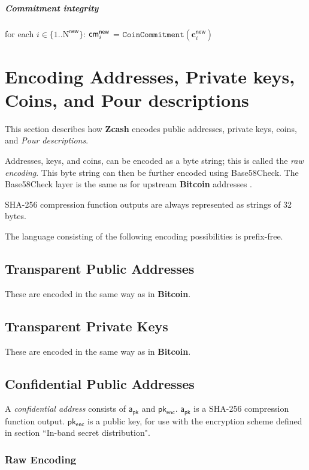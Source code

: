 \documentclass{article}
\newcommand{\changedcolor}{magenta}
\newcommand{\setchanged}{\color{\changedcolor}}
\newcommand{\changed}[1]{{\setchanged{#1}}}
\newcommand{\term}[1]{\textsl{#1}\xspace}
\newcommand{\termbf}[1]{\textbf{#1}\xspace}
\newcommand{\Zcash}{\termbf{Zcash}}
\newcommand{\Bitcoin}{\termbf{Bitcoin}}
\newcommand{\PourDescriptions}{\term{Pour descriptions}}
\newcommand{\publicAddress}{\term{confidential address}}
\newcommand{\SpendAuthorityPublic}{\mathsf{a_{pk}}}
\newcommand{\TransmitPublic}{\mathsf{pk_{enc}}}
\newcommand{\cmNew}[1]{\mathsf{{cm}^{new}_\mathnormal{#1}}}
\newcommand{\NNew}{\mathrm{N}^\mathsf{new}}
\newcommand{\cNew}[1]{\mathbf{c}_{#1}^\mathsf{new}}
\newcommand{\CoinCommitment}[1]{\mathtt{CoinCommitment}(#1)}
\begin{document}
\subparagraph{Commitment integrity}

for each $i \in \{1..\NNew\}$: $\cmNew{i}$ = $\CoinCommitment{\cNew{i}}$

\section{Encoding Addresses, Private keys, Coins, and Pour descriptions}

This section describes how \Zcash encodes public addresses, private keys,
coins, and \PourDescriptions.

Addresses, keys, and coins, can be encoded as a byte string; this is called
the \term{raw encoding}. This byte string can then be further encoded using
Base58Check. The Base58Check layer is the same as for upstream \Bitcoin
addresses \cite{Base58Check}.

SHA-256 compression function outputs are always represented as strings of 32
bytes.

The language consisting of the following encoding possibilities is prefix-free.

\subsection{Transparent Public Addresses}

These are encoded in the same way as in \Bitcoin \cite{Base58Check}.

\subsection{Transparent Private Keys}

These are encoded in the same way as in \Bitcoin \cite{Base58Check}.

\subsection{Confidential Public Addresses}

A \publicAddress consists of $\SpendAuthorityPublic$ and $\TransmitPublic$.
$\SpendAuthorityPublic$ is a SHA-256 compression function output.
$\TransmitPublic$ is a \changed{Curve25519} public key, for use with the
encryption scheme defined in section ``In-band secret distribution".

\subsubsection{Raw Encoding}
\end{document}
